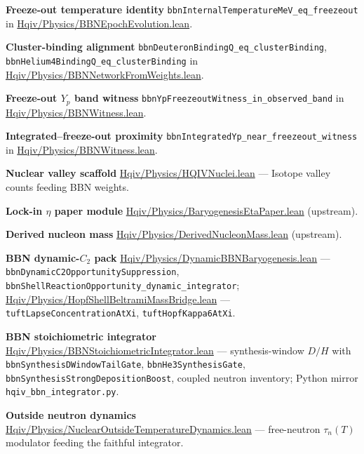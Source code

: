 \documentclass[11pt]{amsart}
\newcommand{\leanrepo}{https://github.com/HQIV/hqiv-lean/blob/main}
\newcommand{\leanfile}[1]{\href{\leanrepo/#1}{\footnotesize\url{#1}}}
\newcommand{\leanid}[1]{\nolinkurl{#1}}
\begin{document}
\begin{description}[leftmargin=2.5em,style=nextline]
\item {}\label{lean:bbn-freezeout-temp}\textbf{Freeze-out temperature identity}
  \leanid{bbnInternalTemperatureMeV\_eq\_freezeout} in
  \leanfile{Hqiv/Physics/BBNEpochEvolution.lean}.
\item {}\label{lean:bbn-cluster-binding}\textbf{Cluster-binding alignment}
  \leanid{bbnDeuteronBindingQ\_eq\_clusterBinding},
  \leanid{bbnHelium4BindingQ\_eq\_clusterBinding} in
  \leanfile{Hqiv/Physics/BBNNetworkFromWeights.lean}.
\item {}\label{lean:bbn-yp-band}\textbf{Freeze-out $Y_p$ band witness}
  \leanid{bbnYpFreezeoutWitness\_in\_observed\_band} in
  \leanfile{Hqiv/Physics/BBNWitness.lean}.
\item {}\label{lean:bbn-yp-near-freeze}\textbf{Integrated--freeze-out proximity}
  \leanid{bbnIntegratedYp\_near\_freezeout\_witness} in
  \leanfile{Hqiv/Physics/BBNWitness.lean}.
\item {}\label{lean:nuclei}\textbf{Nuclear valley scaffold}
  \leanfile{Hqiv/Physics/HQIVNuclei.lean} ---
  Isotope valley counts feeding BBN weights.
\item {}\label{lean:eta-paper}\textbf{Lock-in $\eta$ paper module}
  \leanfile{Hqiv/Physics/BaryogenesisEtaPaper.lean} (upstream).
\item {}\label{lean:derived-mass}\textbf{Derived nucleon mass}
  \leanfile{Hqiv/Physics/DerivedNucleonMass.lean} (upstream).
\item {}\label{lean:bbn-dynamic-c2}\textbf{BBN dynamic-$C_2$ pack}
  \leanfile{Hqiv/Physics/DynamicBBNBaryogenesis.lean} ---
  \leanid{bbnDynamicC2OpportunitySuppression},
  \leanid{bbnShellReactionOpportunity\_dynamic\_integrator};
  \leanfile{Hqiv/Physics/HopfShellBeltramiMassBridge.lean} ---
  \leanid{tuftLapseConcentrationAtXi}, \leanid{tuftHopfKappa6AtXi}.
\item {}\label{lean:bbn-stoichiometric}\textbf{BBN stoichiometric integrator}
  \leanfile{Hqiv/Physics/BBNStoichiometricIntegrator.lean} ---
  synthesis-window $D/H$ with \leanid{bbnSynthesisDWindowTailGate},
  \leanid{bbnHe3SynthesisGate}, \leanid{bbnSynthesisStrongDepositionBoost},
  coupled neutron inventory; Python mirror \texttt{hqiv\_bbn\_integrator.py}.
\item {}\label{lean:bbn-outside-neutron}\textbf{Outside neutron dynamics}
  \leanfile{Hqiv/Physics/NuclearOutsideTemperatureDynamics.lean} ---
  free-neutron $\tau_n(T)$ modulator feeding the faithful integrator.
\end{description}
\end{document}
